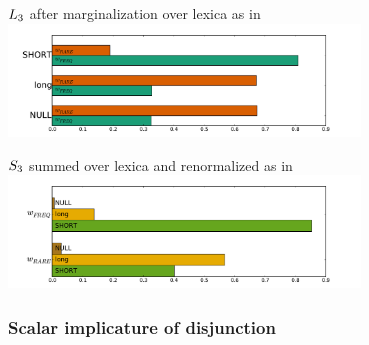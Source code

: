 \documentclass{article}
\begin{document}
\begin{examples}
\item $\ListenerK[3]$ after marginalization over lexica as in  \\
  \includegraphics[width=0.7\textwidth]{fig/manner-expertise-listener-marginalized}

\item $\SpeakerK[3]$ summed over lexica and renormalized as in  \\
  \includegraphics[width=0.7\textwidth]{fig/manner-expertise-speaker-lexsum}
\end{examples}

\newpage

\subsubsection{Scalar implicature of disjunction}\label{sec:scalar-disj}

\end{document}
